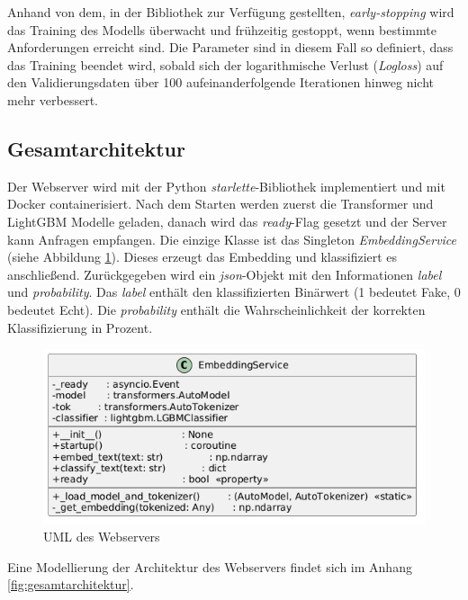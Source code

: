Anhand von dem, in der Bibliothek zur Verfügung gestellten, \textit{early-stopping} wird das Training des Modells überwacht und frühzeitig gestoppt, wenn bestimmte 
Anforderungen erreicht sind. 
Die Parameter sind in diesem Fall so definiert, dass das Training beendet wird, sobald sich der logarithmische Verlust (\textit{Logloss}) auf den 
Validierungsdaten über 100 aufeinanderfolgende Iterationen hinweg nicht mehr verbessert. %

\subsection{Gesamtarchitektur}

Der Webserver wird mit der Python \textit{starlette}-Bibliothek implementiert und mit Docker containerisiert.
Nach dem Starten werden zuerst die Transformer und LightGBM Modelle geladen, danach wird das \textit{ready}-Flag gesetzt und der Server kann Anfragen empfangen.
Die einzige Klasse ist das Singleton \textit{EmbeddingService} (siehe Abbildung \ref{fig:uml_webserver}). Dieses erzeugt das Embedding und klassifiziert es anschließend.
Zurückgegeben wird ein \textit{json}-Objekt mit den Informationen \textit{label} und \textit{probability}. Das \textit{label} enthält den klassifizierten Binärwert 
(1 bedeutet Fake, 0 bedeutet Echt). Die \textit{probability} enthält die Wahrscheinlichkeit der korrekten Klassifizierung in Prozent.

\begin{figure}[htbp]
    \begin{center}
        \includegraphics[scale=0.55]{static/uml_webserver.png}
        \caption{\label{fig:uml_webserver} UML des Webservers} %
    \end{center}
\end{figure}

Eine Modellierung der Architektur des Webservers findet sich im Anhang \ref{fig:gesamtarchitektur}.


